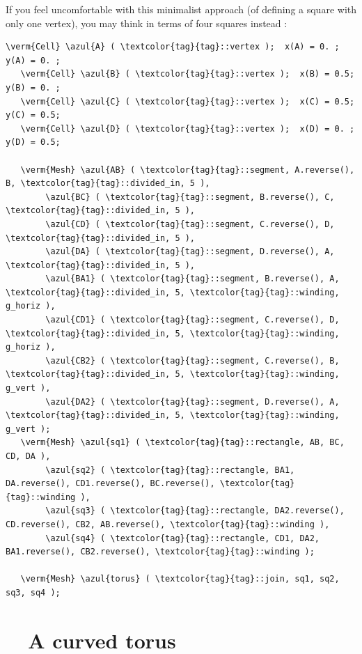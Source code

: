 If you feel uncomfortable with this minimalist approach (of defining a square with only one
vertex), you may think in terms of four squares instead :

\begin{Verbatim}[commandchars=\\\{\},formatcom=\small\tt,
   baselinestretch=0.94,framesep=2mm                      ]
   \verm{Cell} \azul{A} ( \textcolor{tag}{tag}::vertex );  x(A) = 0. ;  y(A) = 0. ;
   \verm{Cell} \azul{B} ( \textcolor{tag}{tag}::vertex );  x(B) = 0.5;  y(B) = 0. ;
   \verm{Cell} \azul{C} ( \textcolor{tag}{tag}::vertex );  x(C) = 0.5;  y(C) = 0.5;
   \verm{Cell} \azul{D} ( \textcolor{tag}{tag}::vertex );  x(D) = 0. ;  y(D) = 0.5;
   
   \verm{Mesh} \azul{AB} ( \textcolor{tag}{tag}::segment, A.reverse(), B, \textcolor{tag}{tag}::divided_in, 5 ),
        \azul{BC} ( \textcolor{tag}{tag}::segment, B.reverse(), C, \textcolor{tag}{tag}::divided_in, 5 ),
        \azul{CD} ( \textcolor{tag}{tag}::segment, C.reverse(), D, \textcolor{tag}{tag}::divided_in, 5 ),
        \azul{DA} ( \textcolor{tag}{tag}::segment, D.reverse(), A, \textcolor{tag}{tag}::divided_in, 5 ),
        \azul{BA1} ( \textcolor{tag}{tag}::segment, B.reverse(), A, \textcolor{tag}{tag}::divided_in, 5, \textcolor{tag}{tag}::winding, g_horiz ),
        \azul{CD1} ( \textcolor{tag}{tag}::segment, C.reverse(), D, \textcolor{tag}{tag}::divided_in, 5, \textcolor{tag}{tag}::winding, g_horiz ),
        \azul{CB2} ( \textcolor{tag}{tag}::segment, C.reverse(), B, \textcolor{tag}{tag}::divided_in, 5, \textcolor{tag}{tag}::winding, g_vert ),
        \azul{DA2} ( \textcolor{tag}{tag}::segment, D.reverse(), A, \textcolor{tag}{tag}::divided_in, 5, \textcolor{tag}{tag}::winding, g_vert );
   \verm{Mesh} \azul{sq1} ( \textcolor{tag}{tag}::rectangle, AB, BC, CD, DA ),
        \azul{sq2} ( \textcolor{tag}{tag}::rectangle, BA1, DA.reverse(), CD1.reverse(), BC.reverse(), \textcolor{tag}{tag}::winding ),
        \azul{sq3} ( \textcolor{tag}{tag}::rectangle, DA2.reverse(), CD.reverse(), CB2, AB.reverse(), \textcolor{tag}{tag}::winding ),
        \azul{sq4} ( \textcolor{tag}{tag}::rectangle, CD1, DA2, BA1.reverse(), CB2.reverse(), \textcolor{tag}{tag}::winding );
	
   \verm{Mesh} \azul{torus} ( \textcolor{tag}{tag}::join, sq1, sq2, sq3, sq4 );
\end{Verbatim}


\section{~~A curved torus}\label{\numb section 7.\numb parag 5}

